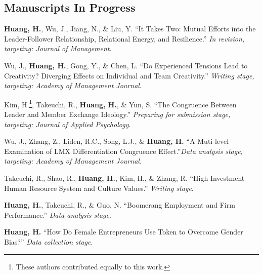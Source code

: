 \documentclass[12pt,letterpaper]{report} %
\begin{document}
   \subsection*{Manuscripts In Progress}
    \begin{tablist}

        \item[]\tab{}\textbf{Huang, H.}, Wu, J., Jiang, N., \& Liu, Y. \enquote{It Takes Two: Mutual Efforts into the Leader-Follower Relationship, Relational Energy, and Resilience.} \textit{In revision, targeting: Journal of Management}.
            
        \item[]\tab{}Wu, J., \textbf{Huang, H.}, Gong, Y., \& Chen, L. \enquote{Do Experienced Tensions Lead to Creativity? Diverging Effects on Individual and Team Creativity.} \textit{Writing stage, targeting: Academy of Management Journal}.

        \item[]\tab{}Kim, H.\footnote{\label{fn:eqauth}These authors contributed equally to this work.}, Takeuchi, R., \textbf{Huang, H.}, \& Yun, S. \enquote{The Congruence Between Leader and Member Exchange Ideology.} \textit{Preparing for submission stage, targeting: Journal of Applied Psychology}.

        \item[]\tab{}Wu, J., Zhang, Z., Liden, R.C., Song, L.J., \& \textbf{Huang, H.} \enquote{A Muti-level Examination of LMX Differentiation Congruence Effect.}\textit{Data analysis stage, targeting: Academy of Management Journal}.

        \item[]\tab{}Takeuchi, R., Shao, R., \textbf{Huang, H.}, Kim, H., \& Zhang, R. \enquote{High Investment Human Resource System and Culture Values.}  \textit{Writing stage}.
        
        \item[]\tab{}\textbf{Huang, H.}, Takeuchi, R., \& Guo, N. \enquote{Boomerang Employment and Firm Performance.} \textit{Data analysis stage}.
        
        \item[]\tab{}\textbf{Huang, H.} \enquote{How Do Female Entrepreneurs Use Token to Overcome Gender Bias?} \textit{Data collection stage}.
        
    \end{tablist}

\end{document}
